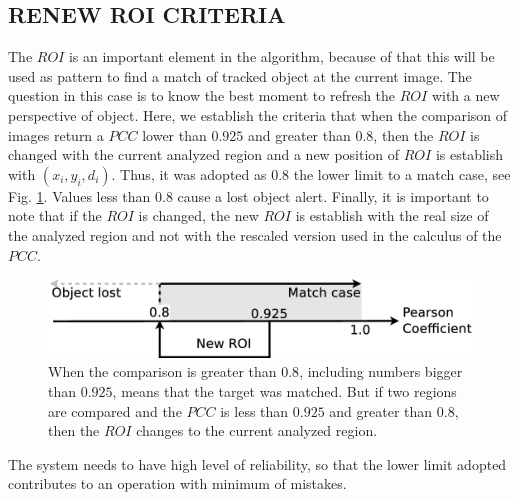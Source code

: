 \subsection{RENEW ROI CRITERIA}
The $ROI$ is an important element in the algorithm, because of that this  
will be used as pattern to find a match of tracked object at the current image. 
The  question in this case is to know the best moment to refresh the $ROI$
with a new perspective of object. 
Here, we establish the criteria that when the comparison of images return 
a $PCC$ lower than $0.925$ and greater than $0.8$, then the $ROI$ is changed with the current 
analyzed region and a new position of $ROI$ is establish with $(x_i,y_i,d_i)$. 
Thus, it was adopted as $0.8$ the lower limit to a match case\cite{Eugene},
see Fig. \ref{fig:newroicri}. Values less than $0.8$ cause a  lost object alert.
Finally, it is important to note that if the $ROI$ is changed, the new $ROI$ is establish
with the real size of the analyzed region and not with the rescaled version used
in the calculus of the $PCC$.


\begin{figure}[H]
\includegraphics[width=\columnwidth]{images/figure3.eps}
\caption{When the comparison is greater than $0.8$, including numbers bigger than 
$0.925$, means that the target was matched. But if two regions are compared 
and the $PCC$ is less than $0.925$ and greater than $0.8$, 
then the $ROI$ changes to the current analyzed region.}
\label{fig:newroicri}
\end{figure}

The system needs to have high level of reliability, so that the lower limit adopted 
contributes to an operation with minimum of mistakes.
